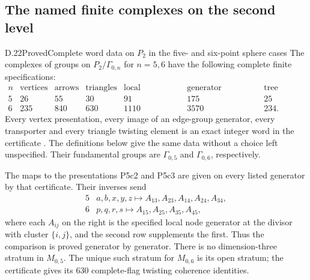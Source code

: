 \subsection{The named finite complexes on the second level}

\begin{result}{D.22}{Proved}{Complete word data on $P_2$ in the five- and six-point sphere cases}
The complexes of groups on $P_2/\Gamma_{0,n}$ for $n=5,6$
have the following complete finite specifications:
\[
\begin{array}{c|rrrrrr}
n&\text{vertices}&\text{arrows}&\text{triangles}&
 \text{local generators}&\text{generator injections}&
 \text{tree arrows}\\\hline
5&26&55&30&91&175&25\\
6&235&840&630&1110&3570&234.
\end{array}
\]
Every vertex presentation, every image of an edge-group generator,
every transporter and every triangle twisting element is an exact
integer word in the certificate
.  The definitions below give the
same data without a choice left unspecified.  Their fundamental
groups are $\Gamma_{0,5}$ and $\Gamma_{0,6}$, respectively.

The maps to the presentations P5c2 and P5c3 are given on every
listed generator by that certificate.  Their inverses send
\[
\begin{array}{c|l}
5&a,b,x,y,z\longmapsto
 A_{13},A_{23},A_{14},A_{24},A_{34},\\
6&p,q,r,s\longmapsto A_{15},A_{25},A_{35},A_{45},
\end{array}
\]
where each $A_{ij}$ on the right is the specified local node
generator at the divisor with cluster $\{i,j\}$, and the second
row supplements the first.  Thus the comparison is proved
generator by generator.  There is no dimension-three stratum
in $M_{0,5}$.  The unique such stratum for $M_{0,6}$ is its open
stratum; the certificate gives its $630$ complete-flag twisting
coherence identities.
\end{result}
